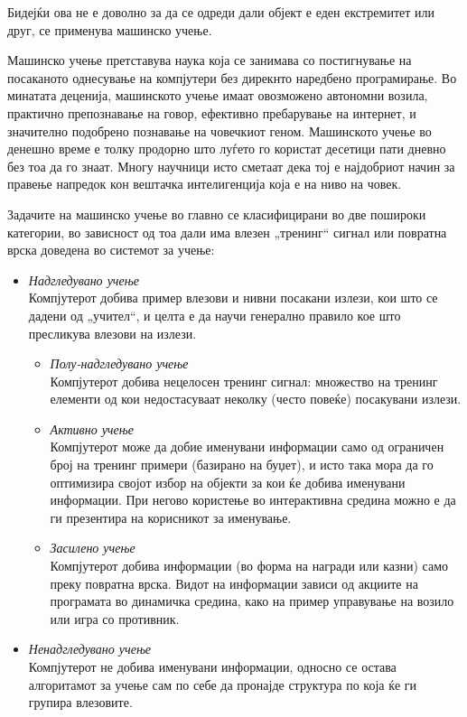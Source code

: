 \documentclass[12pt]{article}
\begin{document}
  Бидејќи ова не е доволно за да се одреди дали објект е еден екстремитет или друг, се применува машинско учење.

	Машинско учење претставува наука која се занимава со постигнување на посаканото однесување на компјутери без дирекнто наредбено програмирање. Во минатата деценија, машинското учење имаат овозможено автономни возила, практично препознавање на говор, ефективно пребарување на интернет, и значително подобрено познавање на човечкиот геном. Машинското учење во денешно време е толку продорно што луѓето го користат десетици пати дневно без тоа да го знаат. Многу научници исто сметаат дека тој е најдобриот начин за правење напредок кон вештачка интелигенција која е на ниво на човек.

	Задачите на машинско учење во главно се класифицирани во две пошироки категории, во зависност од тоа дали има влезен „тренинг“ сигнал или повратна врска доведена во системот за учење:

	\begin{itemize}
		\item \textit{Надгледувано учење}\\Компјутерот добива пример влезови и нивни посакани излези, кои што се дадени од „учител“, и целта е да научи генерално правило кое што пресликува влезови на излези.
    \begin{itemize}
      \item \textit{Полу-надгледувано учење}\\Компјутерот добива нецелосен тренинг сигнал: множество на тренинг елементи од кои недостасуваат неколку (често повеќе) посакувани излези.
      \item \textit{Активно учење}\\Компјутерот може да добие именувани информации само од ограничен број на тренинг примери (базирано на буџет), и исто така мора да го оптимизира својот избор на објекти за кои ќе добива именувани информации. При негово користење во интерактивна средина можно е да ги презентира на корисникот за именување.
      \item \textit{Засилено учење}\\Компјутерот добива информации (во форма на награди или казни) само преку повратна врска. Видот на информации зависи од акциите на програмата во динамичка средина, како на пример управување на возило или игра со противник.
      \end{itemize}
		\item \textit{Ненадгледувано учење}\\Компјутерот не добива именувани информации, односно се остава алгоритамот за учење сам по себе да пронајде структура по која ќе ги групира влезовите.
    \end{itemize}
\end{document}

